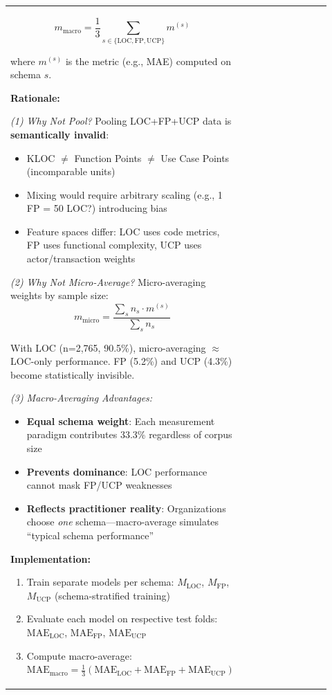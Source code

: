 \documentclass[11pt,a4paper]{article}
\begin{document}
\begin{longtable}{>{\raggedright\arraybackslash}p{0.26\linewidth}|>{\raggedright\arraybackslash}p{0.44\linewidth}|>{\raggedright\arraybackslash}p{0.22\linewidth}}
$$m_{\text{macro}} = \frac{1}{3} \sum_{s \in \{\text{LOC}, \text{FP}, \text{UCP}\}} m^{(s)}$$

where $m^{(s)}$ is the metric (e.g., MAE) computed on schema $s$.

\textbf{Rationale:}

\textit{(1) Why Not Pool?} Pooling LOC+FP+UCP data is \textbf{semantically invalid}:
\begin{itemize}
    \item KLOC $\neq$ Function Points $\neq$ Use Case Points (incomparable units)
    \item Mixing would require arbitrary scaling (e.g., 1 FP = 50 LOC?) introducing bias
    \item Feature spaces differ: LOC uses code metrics, FP uses functional complexity, UCP uses actor/transaction weights
\end{itemize}

\textit{(2) Why Not Micro-Average?} Micro-averaging weights by sample size:
$$m_{\text{micro}} = \frac{\sum_s n_s \cdot m^{(s)}}{\sum_s n_s}$$

With LOC (n=2,765, 90.5\%), micro-averaging $\approx$ LOC-only performance. FP (5.2\%) and UCP (4.3\%) become statistically invisible.

\textit{(3) Macro-Averaging Advantages:}
\begin{itemize}
    \item \textbf{Equal schema weight}: Each measurement paradigm contributes 33.3\% regardless of corpus size
    \item \textbf{Prevents dominance}: LOC performance cannot mask FP/UCP weaknesses
    \item \textbf{Reflects practitioner reality}: Organizations choose \textit{one} schema---macro-average simulates ``typical schema performance''
\end{itemize}

\textbf{Implementation:}
\begin{enumerate}
    \item Train separate models per schema: $M_{\text{LOC}}$, $M_{\text{FP}}$, $M_{\text{UCP}}$ (schema-stratified training)
    \item Evaluate each model on respective test folds: $\text{MAE}_{\text{LOC}}$, $\text{MAE}_{\text{FP}}$, $\text{MAE}_{\text{UCP}}$
    \item Compute macro-average: $\text{MAE}_{\text{macro}} = \frac{1}{3}(\text{MAE}_{\text{LOC}} + \text{MAE}_{\text{FP}} + \text{MAE}_{\text{UCP}})$
\end{enumerate}


\end{longtable}
\end{document}
